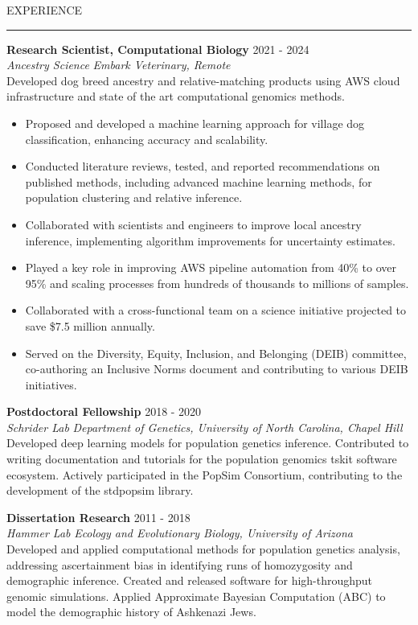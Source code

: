 \documentclass{resume} %
\renewenvironment{rSection}[1]{
\sectionskip
\textcolor{RoyalPurple}{\MakeUppercase{#1}}
\sectionlineskip
\hrule
\begin{list}{}{
\setlength{\leftmargin}{1.5em}
}
\item[]
}{
\end{list}
}
\begin{document}
\begin{rSection}{Experience}


{\bf Research Scientist, Computational Biology} \hfill  2021 - 2024\\ 
{\em Ancestry Science} \hfill {\em Embark Veterinary, Remote}\\
Developed dog breed ancestry and relative-matching products using AWS cloud infrastructure and state of the art computational genomics methods.
\begin{itemize}[noitemsep, topsep=0pt]
    \item Proposed and developed a machine learning approach for village dog classification, enhancing accuracy and scalability.
    \item Conducted literature reviews, tested, and reported recommendations on published methods, including advanced machine learning methods, for population clustering and relative inference.
    \item Collaborated with scientists and engineers to improve local ancestry inference, implementing algorithm improvements for uncertainty estimates.
    \item Played a key role in improving AWS pipeline automation from 40\% to over 95\% and scaling processes from hundreds of thousands to millions of samples.
    \item Collaborated with a cross-functional team on a science initiative projected to save \$7.5 million annually. 
    \item Served on the Diversity, Equity, Inclusion, and Belonging (DEIB) committee, co-authoring an Inclusive Norms document and contributing to various DEIB initiatives.
\end{itemize}
    
{\bf Postdoctoral Fellowship} \hfill  2018 - 2020\\ 
{\em Schrider Lab} \hfill {\em Department of Genetics, University of North Carolina, Chapel Hill}\\
Developed deep learning models for population genetics inference. Contributed to writing documentation and tutorials for the population genomics tskit software ecosystem. Actively participated in the PopSim Consortium, contributing to the development of the stdpopsim library.


{\bf Dissertation Research} \hfill  2011 - 2018\\ 
{\em Hammer Lab} \hfill {\em Ecology and Evolutionary Biology, University of Arizona}\\
Developed and applied computational methods for population genetics analysis, addressing ascertainment bias in identifying runs of homozygosity and demographic inference. Created and released software for high-throughput genomic simulations. Applied Approximate Bayesian Computation (ABC) to model the demographic history of Ashkenazi Jews.

\end{rSection}
\end{document}
